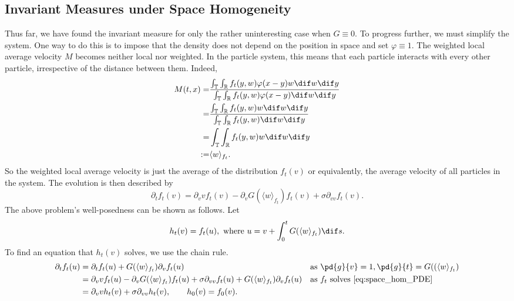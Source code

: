 \documentclass[11pt, a4paper, draft]{article}
\renewcommand{\phi}{\varphi}
\renewcommand{\R}{\mathbb{R}}
\newcommand{\T}{\mathbb{T}}
\begin{document}
        \subsection{Invariant Measures under Space Homogeneity}
        Thus far, we have found the invariant measure for only the rather uninteresting case when $G \equiv 0$. To progress further, we must simplify the system. One way to do this is to impose that the density does not depend on the position in space and set $\phi \equiv 1$. The weighted local average velocity $M$ becomes neither local nor weighted. In the particle system, this means that each particle interacts with every other particle, irrespective of the distance between them. Indeed,
        \begin{align*}
            M(t,x) =&  \frac{\int_{\T}\int_{\R}f_t(y,w)\phi(x-y)w\dif w \dif y}{\int_{\T}\int_{\R}f_t(y,w)\phi(x-y)\dif w \dif y}\\
            =&  \frac{\int_{\T}\int_{\R}f_t(y,w)w\dif w \dif y}{\int_{\T}\int_{\R}f_t(y,w)\dif w \dif y}\\
            =& \int_{\T}\int_{\R}f_t(y,w)w\dif w \dif y\\
            :=& \langle w \rangle_{f_t}.
        \end{align*}
        So the weighted local average velocity is just the average of the distribution $f_t(v)$ or equivalently, the average velocity of all particles in the system. The evolution is then described by
        \begin{equation}\label{eq:space_hom_PDE}
            \partial_t f_t(v) = \partial_v vf_t(v) - \partial_v G(\langle w \rangle_{f_t})f_t(v) + \sigma \partial_{vv} f_t(v).
        \end{equation}
        The above problem's well-posedness can be shown as follows. Let
        \[
            h_t(v) = f_t(u),\text{ where } u = v + \int_0^t G(\langle w\rangle_{f_t}) \dif s.
        \]
        To find an equation that $h_t(v)$ solves, we use the chain rule.
        \begin{align*}
            \partial_t f_t(u) &= \partial_t f_t(u) +  G(\langle w\rangle_{f_t})\partial_v f_t(u) && \text{as   } \pd{g}{v} = 1, \pd{g}{t} = G((\langle w\rangle_{f_t})\\
            &=\partial_v vf_t(u) - \partial_v G(\langle w \rangle_{f_t})f_t(u) + \sigma \partial_{vv} f_t(u) + G(\langle w\rangle_{f_t})\partial_v f_t(u) &&\text{as  } f_t \text{ solves } \eqref{eq:space_hom_PDE}\\
            &=\partial_v vh_t(v) + \sigma \partial_{vv} h_t(v) , \qquad h_0(v) =f_0(v).
        \end{align*}
\end{document}
